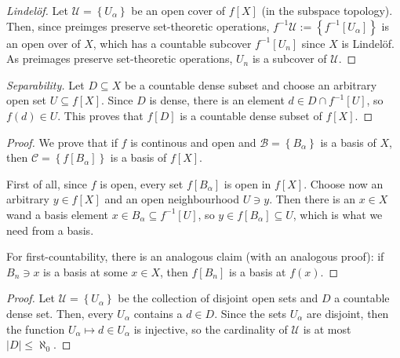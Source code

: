 \begin{proof}[Lindel\"of]
    Let \( \mathcal{U} = \left\{ U_\alpha \right\} \) be an open cover of \( f[X] \) (in the subspace topology). Then, since preimges preserve set-theoretic operations, \( f^{-1} \mathcal{U} := \left\{ f^{-1}[U_\alpha] \right\} \) is an open over of \( X \), which has a countable subcover \( f^{-1}[U_n] \) since \( X \) is Lindel\"of. As preimages preserve set-theoretic operations, \( U_n \) is a subcover of \( \mathcal{U} \).
\end{proof}

\begin{proof}[Separability]
    Let \( D \subseteq X\) be a countable dense subset and choose an arbitrary open set \( U \subseteq f[X] \). Since \( D \) is dense, there is an element \( d \in D \cap f^{-1}[U] \), so \( f(d) \in U \). This proves that \( f[D] \) is a countable dense subset of \( f[X] \).
\end{proof}


\begin{proof}
    We prove that if \( f \) is continous and open and \( \mathcal{B} = \left\{ B_\alpha \right\} \) is a basis of \( X \), then \( \mathcal{C} = \left\{ f[B_\alpha] \right\} \) is a basis of \( f[X] \).

    First of all, since \( f \) is open, every set \( f[B_\alpha] \) is open in \( f[X] \). Choose now an arbitrary \( y \in f[X] \) and an open neighbourhood \( U \ni y \). Then there is an \( x \in X \) wand a basis element \( x \in B_\alpha \subseteq f^{-1}[U] \), so \( y \in f[B_\alpha] \subseteq U \), which is what we need from a basis.

    For first-countability, there is an analogous claim (with an analogous proof): if \( B_n \ni x \) is a basis at some \( x \in X \), then \( f[B_n] \) is a basis at \( f(x) \).
\end{proof}

\begin{proof}
    Let \( \mathcal{U} = \left\{ U_\alpha \right\} \) be the collection of disjoint open sets and \( D \) a countable dense set. Then, every \( U_\alpha \) contains a \( d \in D \). Since the sets \( U_\alpha \) are disjoint, then the function \( U_\alpha \mapsto d \in U_\alpha \) is injective, so the cardinality of \( \mathcal{U} \) is at most \( \left| D \right| \leqslant \aleph_0 \).
\end{proof}

